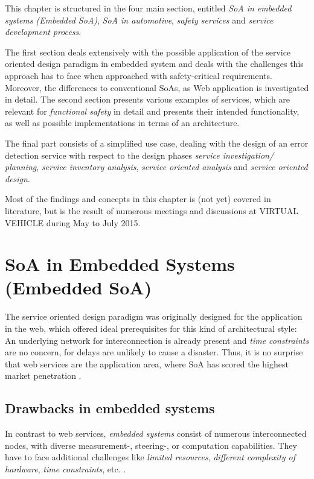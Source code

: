 \label{ch:methods}

This chapter is structured in the four main section, entitled \emph{SoA in embedded systems (Embedded SoA)}, \emph{SoA in automotive}, \emph{safety services} and \emph{service development process}. 

The first section deals extensively with the possible application of the service oriented design paradigm in embedded system and deals with the challenges this approach has to face when approached with safety-critical requirements. Moreover, the differences to conventional SoAs, as Web application is investigated in detail. 
The second section presents various examples of services, which are relevant for \emph{functional safety} in detail and presents their intended functionality, as well as possible implementations in terms of an architecture.

The final part consists of a simplified use case, dealing with the design of an error detection service with respect to the design phases \emph{service investigation/ planning}, \emph{service inventory analysis}, \emph{service oriented analysis} and \emph{service oriented design}.

Most of the findings and concepts in this chapter is (not yet) covered in literature, but is the result of numerous meetings and discussions at VIRTUAL VEHICLE during May to July 2015.









\section{SoA in Embedded Systems (Embedded SoA)}
\label{sec:soa-in-embedded-systems}

The service oriented design paradigm was originally designed for the application in the web, which offered ideal prerequisites for this kind of architectural style: An underlying network for interconnection is already present and \emph{time constraints} are no concern, for delays are unlikely to cause a disaster. Thus, it is no surprise that web services are the application area, where SoA has scored the highest market penetration \cite{rodrigues2011} \cite{buckl}.


\subsection{Drawbacks in embedded systems}
In contrast to web services, \emph{embedded systems} consist of numerous interconnected nodes, with diverse measurement-, steering-, or computation capabilities. They have to face additional challenges like \emph{limited resources}, \emph{different complexity of hardware}, \emph{time constraints}, etc. \cite{scholz} \cite{sommer}. 


